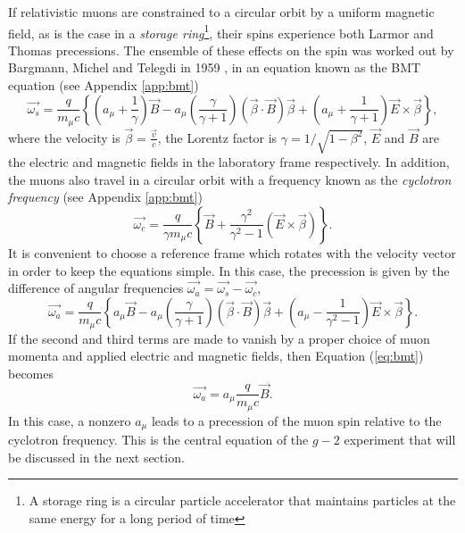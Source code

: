 \documentclass{outhesis}
\begin{document}
If relativistic muons are constrained to a circular orbit by a uniform magnetic field, as is the case in a \emph{storage ring}\footnote{A storage ring is a circular particle accelerator that maintains particles at the same energy for a long period of time}, their spins experience both Larmor and Thomas precessions. The ensemble of these effects on the spin was worked out by Bargmann, Michel and Telegdi in 1959 \cite{bmt}, in an equation known as the BMT equation (see Appendix \ref{app:bmt})
\begin{equation}
\overrightarrow{\omega_s} =  \frac{q}{m_{\mu}c}\left\{\left(a_{\mu} + \frac{1}{\gamma}\right)\overrightarrow{B}    -   a_{\mu}\left(\frac{\gamma}{\gamma + 1}\right)\left(\overrightarrow{\beta} \cdot \overrightarrow{B}\right)\overrightarrow{\beta}   +   \left(a_{\mu}+\frac{1}{\gamma + 1}\right)\overrightarrow{E} \times\overrightarrow{\beta}                 \right\},
\end{equation}
where the velocity is $\displaystyle \overrightarrow{\beta} = \frac{\overrightarrow{v} }{c}$, the Lorentz factor is $\displaystyle \gamma = 1/\sqrt{1-\beta^2}$, $\overrightarrow{E}$ and $\overrightarrow{B} $ are the electric and magnetic fields in the laboratory frame respectively. In addition, the muons also travel in a circular orbit with a frequency known as the \emph{cyclotron frequency} (see Appendix \ref{app:bmt})
\begin{equation}
\overrightarrow{\omega_c} = \frac{q}{\gamma m_{\mu}c}\left\{\overrightarrow{B} + \frac{\gamma^2}{\gamma^2-1} \left(\overrightarrow{E} \times \overrightarrow{\beta}\right)\right\}.
\label{eq:c}
\end{equation}
It is convenient to choose a reference frame which rotates with the velocity vector in order to keep the equations simple. In this case, the precession is given by the difference of angular frequencies $\overrightarrow{\omega_a} = \overrightarrow{\omega_s} - \overrightarrow{\omega_c}$, 
\begin{equation}
\overrightarrow{\omega_a} =   \frac{q}{m_{\mu}c}\left\{a_{\mu}\overrightarrow{B}   -   a_{\mu}\left(\frac{\gamma}{\gamma + 1}\right)\left(\overrightarrow{\beta} \cdot \overrightarrow{B}\right)\overrightarrow{\beta} +   \left(a_{\mu}-\frac{1}{\gamma^2 - 1}\right)\overrightarrow{E} \times\overrightarrow{\beta}                 \right\}.
\label{eq:bmt}
 \end{equation}
If the second and third terms are made to vanish by a proper choice of muon momenta and applied electric and magnetic fields, then Equation (\ref{eq:bmt}) becomes
\begin{equation}
\overrightarrow{\omega_a} =   a_{\mu}\frac{q}{m_{\mu}c}\overrightarrow{B}. 
\label{eq:wa}
\end{equation}
In this case, a nonzero $a_{\mu}$ leads to a precession of the muon spin relative to the cyclotron frequency. This is the central equation of the $g-2$ experiment that will be discussed in the next section. 
\end{document}
